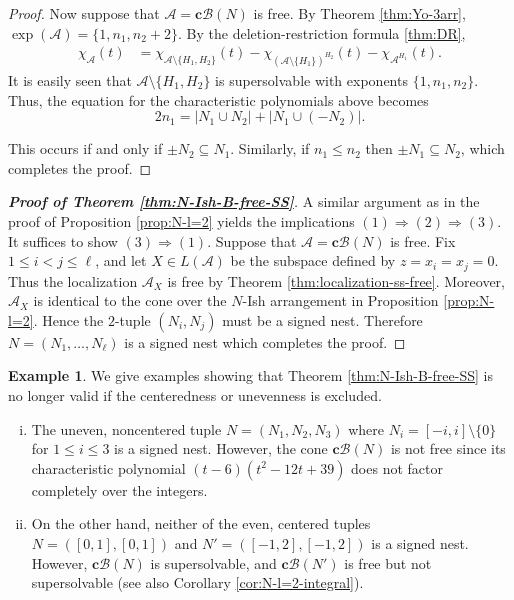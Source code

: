 \documentclass[11pt]{article}
\theoremstyle{definition}
\newtheorem{example}[theo]{Example}
\numberwithin{equation}{section}
\newcommand{\A}{\mathcal{A}}
\newcommand{\B}{\mathcal{B}}
\newcommand{\tbf}{\textbf}
\begin{document}
\begin{proof}
Now suppose that $ \mathcal{A}=\tbf{c}\B(N)$ is free.
By Theorem \ref{thm:Yo-3arr}, $\exp(\A) = \{1,n_1,n_2+2\}$. 
By the deletion-restriction formula \ref{thm:DR}, 
\begin{align*}
{\chi}_\mathcal{A}(t)  & = {\chi}_{\mathcal{A} \setminus \{H_1,H_2\}}( t)-{\chi}_{(\mathcal{A} \setminus \{H_1\})^{H_2}} ( t)-{\chi}_{\mathcal{A}^{H_1}}( t).
\end{align*}
It is easily seen that $\mathcal{A} \setminus \{H_1,H_2\}$ is supersolvable with exponents $\{1, n_1,n_2\}$. 
Thus, the equation for the characteristic polynomials above becomes 
\begin{equation*}
 \label{eq:DO}
2n_1 = |N_1 \cup N_2| + |N_1 \cup (-N_2)|.
\end{equation*}

This occurs if and only if $\pm N_2 \subseteq N_1$. 
Similarly, if $n _1 \le n_2$ then $\pm N_1 \subseteq N_2$, which completes the proof.
\end{proof}


\begin{proof}[\tbf{Proof of  Theorem \ref{thm:N-Ish-B-free-SS}}]
A similar argument as in the proof of Proposition \ref{prop:N-l=2} yields the implications $(1) \Rightarrow (2) \Rightarrow (3)$. It suffices to show $(3) \Rightarrow (1)$. 
Suppose that $ \mathcal{A}=\tbf{c}\B(N)$ is free. 
Fix $1 \leq i < j \leq \ell$, and let $X\in L(\A)$ be the subspace defined by $z=x_{i}=x_j=0$.  
Thus the localization $\A_X$ is free by Theorem \ref{thm:localization-ss-free}. 
Moreover, $\A_X$ is identical to the cone over the $N$-Ish arrangement in Proposition \ref{prop:N-l=2}. 
Hence the $2$-tuple $(N_i, N_j)$ must be a signed nest. 
Therefore $N = (N_1, \ldots, N_\ell)$ is a signed nest which completes the proof.
 \end{proof} 

  \begin{example}
\label{ex:NI-no}
We give examples showing that Theorem \ref{thm:N-Ish-B-free-SS} is no longer valid if the centeredness or unevenness is excluded.
 \begin{enumerate}[(i)]
\item The  uneven, noncentered tuple $N = (N_1,N_2,N_3)$ where $N_i =[-i,i]\setminus\{0\}$ for $1 \le i \le 3$ is a signed nest. 
However, the cone $\tbf{c}\B(N)$ is not free since its characteristic polynomial  $(t-6)(t^2-12t+39)$ does not factor completely over the integers.
\item On the other hand, neither of the even, centered tuples $N = ( [0,1] , [0,1] )$ and $N' = ( [-1,2] , [-1,2] )$ is a signed nest. 
However, $\tbf{c}\B(N)$ is supersolvable, and $\tbf{c}\B(N')$ is  free but not supersolvable (see also Corollary  \ref{cor:N-l=2-integral}). 
\end{enumerate}
\end{example}
\end{document}
